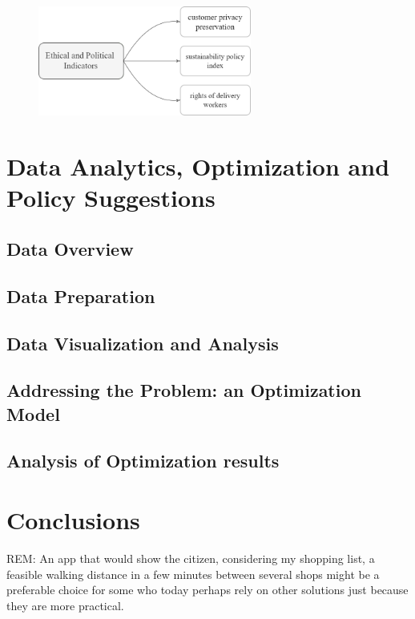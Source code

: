     \begin{figure}[h!]
        \centering
        \includegraphics[width=7cm]{figs/ethic}
        \label{fig:env}
      \end{figure}






\newpage
\section{Data Analytics, Optimization and Policy Suggestions}

\subsection{Data Overview}

\subsection{Data Preparation}

\subsection{Data Visualization and Analysis}

\subsection{Addressing the Problem: an Optimization Model}

\subsection{Analysis of Optimization results}

\section*{Conclusions}

REM: 
An app that would show the citizen, considering my shopping list, a feasible walking distance in a few minutes between several shops might be a preferable choice for some who today perhaps rely on other solutions just because they are more practical.

\newpage




